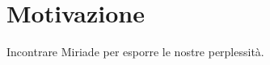 \documentclass[../Riunione16-01-07.tex]{subfiles}
\begin{document}
\section{Motivazione}
Incontrare Miriade per esporre le nostre perplessità.
\end{document}
